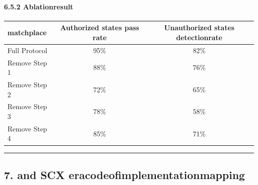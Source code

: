 \documentclass[
  12pt,
]{article}
\begin{document}
\paragraph{6.5.2 Ablationresult}\label{ux6d88ux878dux7ed3ux679c}

\begin{longtable}[]{@{}lcc@{}}
\toprule\noalign{}
matchplace & Authorized states pass rate & Unauthorized states detectionrate \\
\midrule\noalign{}
\endhead
\bottomrule\noalign{}
\endlastfoot
Full Protocol & 95\% & 82\% \\
Remove Step 1 & 88\% & 76\% \\
Remove Step 2 & 72\% & 65\% \\
Remove Step 3 & 78\% & 58\% \\
Remove Step 4 & 85\% & 71\% \\
\end{longtable}

\begin{center}\rule{0.5\linewidth}{0.5pt}\end{center}

\subsection{7. and SCX
eracodeofimplementationmapping}\label{ux4e0e-scx-ux4ee3ux7801ux7684ux5b9eux73b0ux6620ux5c04}
\end{document}
